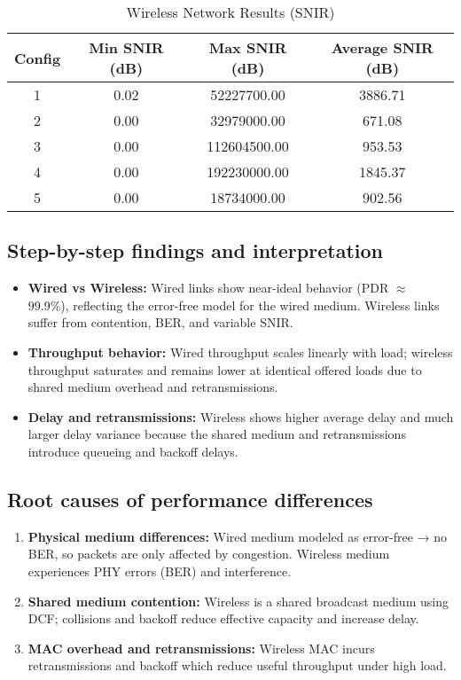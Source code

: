\documentclass{rapport}
\begin{document}
\begin{table}[H]
\centering
\caption{Wireless Network Results (SNIR)}
\begin{tabular}{|c|c|c|c|}
\hline
Config & Min SNIR (dB) & Max SNIR (dB) & Average SNIR (dB)  \\
\hline
1 & 0.02  & 52227700.00 & 3886.71  \\
2 & 0.00 & 32979000.00 & 671.08  \\
3 & 0.00 & 112604500.00 & 953.53 \\
4 &  0.00 & 192230000.00   & 1845.37 \\
5 & 0.00  & 18734000.00  & 902.56  \\
\hline
\end{tabular}
\end{table}

\subsection{Step-by-step findings and interpretation}
\begin{itemize}
    \item \textbf{Wired vs Wireless:} Wired links show near-ideal behavior (PDR $\approx$ 99.9\%), reflecting the error-free model for the wired medium. Wireless links suffer from contention, BER, and variable SNIR.
    \item \textbf{Throughput behavior:} Wired throughput scales linearly with load; wireless throughput saturates and remains lower at identical offered loads due to shared medium overhead and retransmissions.
    \item \textbf{Delay and retransmissions:} Wireless shows higher average delay and much larger delay variance because the shared medium and retransmissions introduce queueing and backoff delays.
\end{itemize}

\subsection{Root causes of performance differences }
\begin{enumerate}
  \item \textbf{Physical medium differences:} Wired medium modeled as error-free → no BER, so packets are only affected by congestion. Wireless medium experiences PHY errors (BER) and interference.
  \item \textbf{Shared medium contention:} Wireless is a shared broadcast medium using DCF; collisions and backoff reduce effective capacity and increase delay.
  \item \textbf{MAC overhead and retransmissions:} Wireless MAC incurs retransmissions and backoff which reduce useful throughput under high load.
\end{enumerate}
\end{document}
